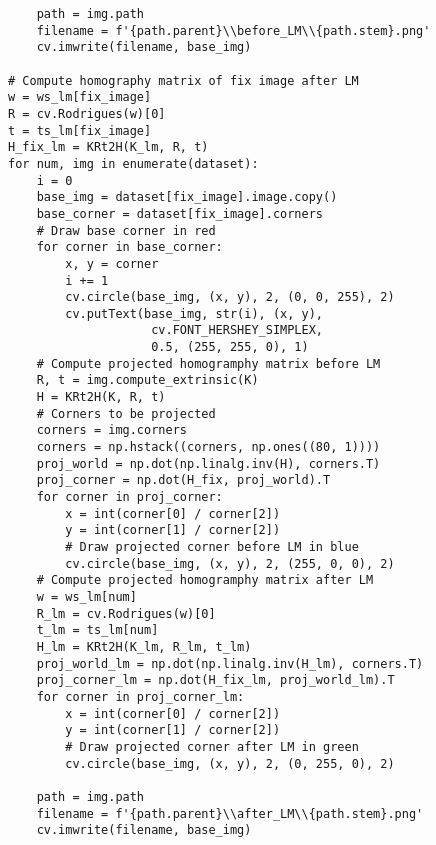 \documentclass[11pt]{article}
\begin{document}
\begin{lstlisting}
    path = img.path
    filename = f'{path.parent}\\before_LM\\{path.stem}.png'
    cv.imwrite(filename, base_img)

# Compute homography matrix of fix image after LM
w = ws_lm[fix_image]
R = cv.Rodrigues(w)[0]
t = ts_lm[fix_image]
H_fix_lm = KRt2H(K_lm, R, t)
for num, img in enumerate(dataset):
    i = 0
    base_img = dataset[fix_image].image.copy()
    base_corner = dataset[fix_image].corners
    # Draw base corner in red
    for corner in base_corner:
        x, y = corner
        i += 1
        cv.circle(base_img, (x, y), 2, (0, 0, 255), 2)
        cv.putText(base_img, str(i), (x, y), 
                    cv.FONT_HERSHEY_SIMPLEX, 
                    0.5, (255, 255, 0), 1)
    # Compute projected homogramphy matrix before LM
    R, t = img.compute_extrinsic(K)
    H = KRt2H(K, R, t)
    # Corners to be projected
    corners = img.corners
    corners = np.hstack((corners, np.ones((80, 1))))
    proj_world = np.dot(np.linalg.inv(H), corners.T)
    proj_corner = np.dot(H_fix, proj_world).T
    for corner in proj_corner:
        x = int(corner[0] / corner[2])
        y = int(corner[1] / corner[2])
        # Draw projected corner before LM in blue
        cv.circle(base_img, (x, y), 2, (255, 0, 0), 2)
    # Compute projected homogramphy matrix after LM
    w = ws_lm[num]
    R_lm = cv.Rodrigues(w)[0]
    t_lm = ts_lm[num]
    H_lm = KRt2H(K_lm, R_lm, t_lm)
    proj_world_lm = np.dot(np.linalg.inv(H_lm), corners.T)
    proj_corner_lm = np.dot(H_fix_lm, proj_world_lm).T
    for corner in proj_corner_lm:
        x = int(corner[0] / corner[2])
        y = int(corner[1] / corner[2])
        # Draw projected corner after LM in green
        cv.circle(base_img, (x, y), 2, (0, 255, 0), 2)

    path = img.path
    filename = f'{path.parent}\\after_LM\\{path.stem}.png'
    cv.imwrite(filename, base_img)
\end{lstlisting}

\end{document}
